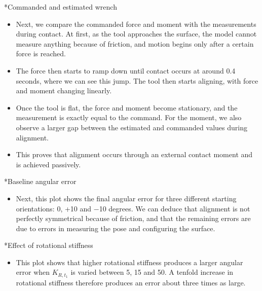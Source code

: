 \documentclass[12pt,a4paper]{article}
\makeatletter
\renewcommand\section{\@startsection{section}{1}{0pt}{14pt}{6pt}{\normalfont\Large\bfseries\color{navy}}}
\makeatother
\begin{document}
\section*{Commanded and estimated wrench}
\begin{itemize}
\item Next, we compare the commanded force and moment with the measurements during contact. At first, as the tool approaches the surface, the model cannot measure anything because of friction, and motion begins only after a certain force is reached.
\item The force then starts to ramp down until contact occurs at around 0.4 seconds, where we can see this jump. The tool then starts aligning, with force and moment changing linearly.
\item Once the tool is flat, the force and moment become stationary, and the measurement is exactly equal to the command. For the moment, we also observe a larger gap between the estimated and commanded values during alignment.
\item This proves that alignment occurs through an external contact moment and is achieved passively.
\end{itemize}

\section*{Baseline angular error}
\begin{itemize}
\item Next, this plot shows the final angular error for three different starting orientations: 0, +10 and \ensuremath{-}10 degrees. We can deduce that alignment is not perfectly symmetrical because of friction, and that the remaining errors are due to errors in measuring the pose and configuring the surface.
\end{itemize}

\section*{Effect of rotational stiffness}
\begin{itemize}
\item This plot shows that higher rotational stiffness produces a larger angular error when \(K_{R,t_1}\) is varied between 5, 15 and 50. A tenfold increase in rotational stiffness therefore produces an error about three times as large.
\end{itemize}
\end{document}
